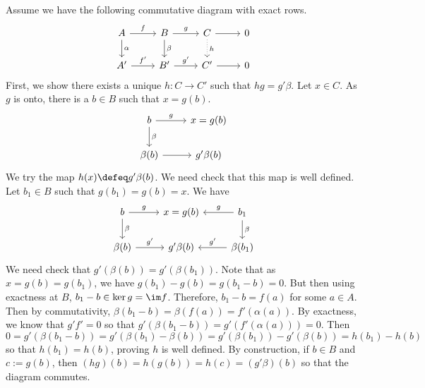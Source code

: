 \pf Assume we have the following commutative diagram with exact rows.
	\[
	\begin{tikzcd}
	A \arrow{r}{f} \arrow{d}{\alpha} & B \arrow{r}{g} \arrow{d}{\beta} & C \arrow{r} \arrow[dotted]{d}{h} & 0 \\
	A' \arrow{r}{f'} & B' \arrow{r}{g'} & C' \arrow{r} & 0
	\end{tikzcd}
	\]
First, we show there exists a unique $h: C \rightarrow C'$ such that $hg=g' \beta$. Let $x \in C$. As $g$ is onto, there is a $b \in B$ such that $x=g(b)$. 
        \[
        \begin{tikzcd}
        b \arrow{r}{g} \arrow{d}{\beta} & x=g(b) \\
        \beta(b) \arrow{r} & g'\beta(b)
        \end{tikzcd}
        \]
We try the map $h(x) \defeq g'\beta(b)$. We need check that this map is well defined. Let $b_1 \in B$ such that $g(b_1)=g(b)=x$. We have
        \[
        \begin{tikzcd}
        b \arrow{r}{g} \arrow{d}{\beta} & x=g(b) & b_1 \arrow[swap]{l}{g} \arrow{d}{\beta} \\
        \beta(b) \arrow{r}{g'} & g'\beta(b) & \beta(b_1) \arrow[swap]{l}{g'} 
        \end{tikzcd}
        \]
We need check that $g'(\beta(b))=g'(\beta(b_1))$. Note that as $x= g(b)=g(b_1)$, we have $g(b_1) - g(b)= g(b_1 - b)=0$. But then using exactness at $B$, $b_1-b \in \ker g= \im f$. Therefore,  $b_1-b=f(a)$ for some $a \in A$. Then by commutativity, $\beta(b_1-b)= \beta(f(a))= f'(\alpha(a))$. By exactness, we know that $g'f'= 0$ so that $g'(\beta(b_1-b))=g'(f'(\alpha(a)))=0$. Then 
	\[
	0= g'(\beta(b_1-b))= g'(\beta(b_1)-\beta(b))= g'(\beta(b_1)) - g'(\beta(b))= h(b_1) - h(b)
	\]
so that $h(b_1)= h(b)$, proving $h$ is well defined. By construction, if $b \in B$ and $c:= g(b)$, then $(hg)(b)= h(g(b))= h(c)= (g' \beta)(b)$ so that the diagram commutes. 
	







